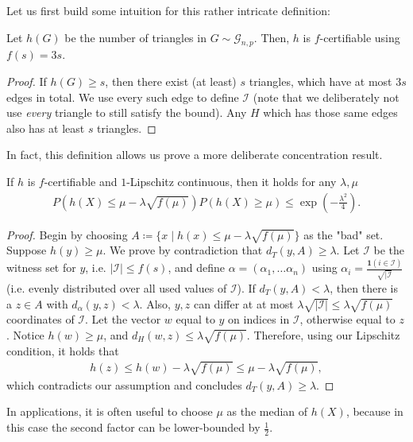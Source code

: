 Let us first build some intuition for this rather intricate definition:
\begin{example}
    Let $h(G)$ be the number of triangles in $G \sim \mathcal G_{n,p}$.
    Then, $h$ is $f$-certifiable using $f(s) = 3s$.
    \begin{proof}
        If $h(G) \geq s$, then there exist (at least) $s$ triangles, which have at most $3s$ edges in total.
        We use every such edge to define $\mathcal I$ (note that we deliberately not use \emph{every} triangle to still satisfy the bound).
        Any $H$ which has those same edges also has at least $s$ triangles.
    \end{proof}
\end{example}
In fact, this definition allows us prove a more deliberate concentration result.
\begin{theorem}\label{thm:talagrand_cert}
    If $h$ is $f$-certifiable and $1$-Lipschitz continuous, then it holds for any $\lambda,\mu$
    \begin{align*}
        P\left(h(X) \leq \mu - \lambda \sqrt{f(\mu)}\right) P(h(X) \geq \mu) \leq \exp\left(-\frac{\lambda^2}{4}\right).
    \end{align*}
\end{theorem}
\begin{proof}
    Begin by choosing $A \coloneqq \{x \mid h(x) \leq \mu - \lambda \sqrt{f(\mu)} \}$
    as the "bad" set.
    Suppose $h(y) \geq \mu$. We prove by contradiction that $d_T(y,A) \geq \lambda$.
    Let $\mathcal I$ be the witness set for $y$, i.e. $|\mathcal I| \leq f(s)$,
    and define $\alpha = (\alpha_1, \dots \alpha_n)$ using $\alpha_i = \frac{\mathbf{1}(i \in \mathcal I)}{\sqrt{|\mathcal I}}$
    (i.e. evenly distributed over all used values of $\mathcal I$).
    If $d_T(y,A) < \lambda$, then there is a $z \in A$ with $d_\alpha(y,z) < \lambda$.
    Also, $y,z$ can differ at at most $\lambda \sqrt{|\mathcal I|} \leq \lambda \sqrt{f(\mu)}$ coordinates of $\mathcal I$.
    Let the vector $w$ equal to $y$ on indices in $\mathcal I$, otherwise equal to $z$.
    Notice $h(w)\geq \mu$, and $d_H(w,z) \leq \lambda \sqrt{f(\mu)}$.
    Therefore, using our Lipschitz condition, it holds that
    \begin{align*}
        h(z) \leq h(w) - \lambda\sqrt{f(\mu)} \leq \mu - \lambda \sqrt{f(\mu)},
    \end{align*}
    which contradicts our assumption and concludes $d_T(y,A) \geq \lambda$.
\end{proof}
\begin{remark} \label{rem:mu_as_med}
    In applications, it is often useful to choose $\mu$ as the median of $h(X)$,
    because in this case the second factor can be lower-bounded by $\frac{1}{2}$.
\end{remark}

